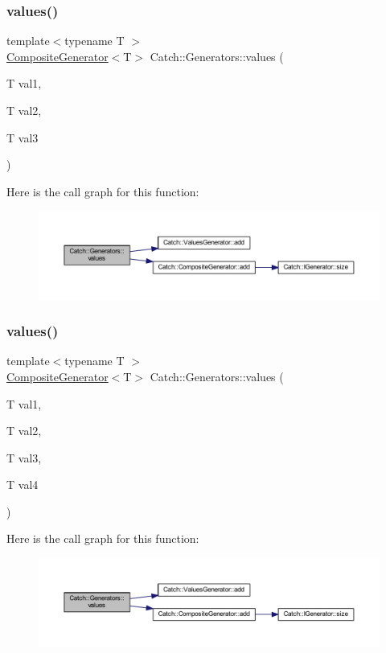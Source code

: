 \subsubsection{\texorpdfstring{values()}{values()}\hspace{0.1cm}{\footnotesize\ttfamily [2/3]}}
{\footnotesize\ttfamily template$<$typename T $>$ \\
\hyperlink{class_catch_1_1_composite_generator}{Composite\+Generator}$<$T$>$ Catch\+::\+Generators\+::values (\begin{DoxyParamCaption}\item[{T}]{val1,  }\item[{T}]{val2,  }\item[{T}]{val3 }\end{DoxyParamCaption})}

Here is the call graph for this function\+:\nopagebreak
\begin{figure}[H]
\begin{center}
\leavevmode
\includegraphics[width=350pt]{namespace_catch_1_1_generators_a496c4a826107e47203b6c609cfd8c2c5_cgraph}
\end{center}
\end{figure}
\hypertarget{namespace_catch_1_1_generators_afb1dcf02bfc8cdf990f27fdc7d7e4a4e}{}\label{namespace_catch_1_1_generators_afb1dcf02bfc8cdf990f27fdc7d7e4a4e} 
\subsubsection{\texorpdfstring{values()}{values()}\hspace{0.1cm}{\footnotesize\ttfamily [3/3]}}
{\footnotesize\ttfamily template$<$typename T $>$ \\
\hyperlink{class_catch_1_1_composite_generator}{Composite\+Generator}$<$T$>$ Catch\+::\+Generators\+::values (\begin{DoxyParamCaption}\item[{T}]{val1,  }\item[{T}]{val2,  }\item[{T}]{val3,  }\item[{T}]{val4 }\end{DoxyParamCaption})}

Here is the call graph for this function\+:\nopagebreak
\begin{figure}[H]
\begin{center}
\leavevmode
\includegraphics[width=350pt]{namespace_catch_1_1_generators_afb1dcf02bfc8cdf990f27fdc7d7e4a4e_cgraph}
\end{center}
\end{figure}
